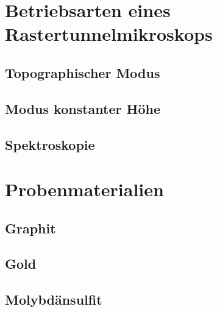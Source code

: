 \section{Betriebsarten eines Rastertunnelmikroskops}
    \subsection{Topographischer Modus}
    \subsection{Modus konstanter Höhe}
    \subsection{Spektroskopie}

\section{Probenmaterialien}
    \subsection{Graphit}
    \subsection{Gold}
    \subsection{Molybdänsulfit}
